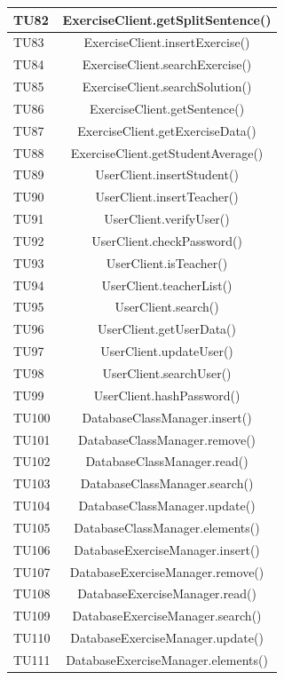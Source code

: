\begin{longtable}{|>{\centering\arraybackslash}m{1.6cm}|c|}
		TU82 & ExerciseClient.getSplitSentence()  \\ \hline
		TU83 & ExerciseClient.insertExercise()  \\ \hline
		TU84 & ExerciseClient.searchExercise()  \\ \hline
		TU85 & ExerciseClient.searchSolution()  \\ \hline
		TU86 & ExerciseClient.getSentence()  \\ \hline
		TU87 & ExerciseClient.getExerciseData()  \\ \hline
		TU88 & ExerciseClient.getStudentAverage()  \\ \hline
		TU89 & UserClient.insertStudent()  \\ \hline
		TU90 & UserClient.insertTeacher()  \\ \hline
		TU91 & UserClient.verifyUser()  \\ \hline
		TU92 & UserClient.checkPassword()  \\ \hline
		TU93 & UserClient.isTeacher()  \\ \hline
		TU94 & UserClient.teacherList()  \\ \hline
		TU95 & UserClient.search()  \\ \hline
		TU96 & UserClient.getUserData()  \\ \hline
		TU97 & UserClient.updateUser()  \\ \hline
		TU98 & UserClient.searchUser()  \\ \hline
		TU99 & UserClient.hashPassword()  \\ \hline
		TU100 & DatabaseClassManager.insert()  \\ \hline
		TU101 & DatabaseClassManager.remove()  \\ \hline
		TU102 & DatabaseClassManager.read()  \\ \hline
		TU103 & DatabaseClassManager.search()  \\ \hline
		TU104 & DatabaseClassManager.update()  \\ \hline
		TU105 & DatabaseClassManager.elements()  \\ \hline
		TU106 & DatabaseExerciseManager.insert()  \\ \hline
		TU107 & DatabaseExerciseManager.remove()  \\ \hline
		TU108 & DatabaseExerciseManager.read()  \\ \hline
		TU109 & DatabaseExerciseManager.search()  \\ \hline
		TU110 & DatabaseExerciseManager.update()  \\ \hline
		TU111 & DatabaseExerciseManager.elements()  \\ \hline

\end{longtable}

